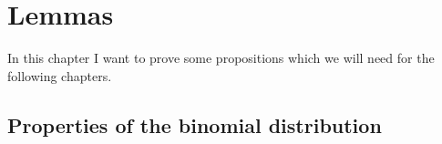 \chapter{Lemmas}

In this chapter I want to prove some propositions which we will need for the following chapters.

\section{Properties of the binomial distribution}


